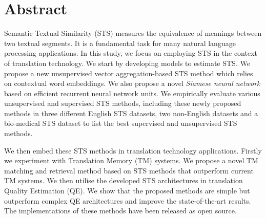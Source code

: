\newpage
{} \label{abstract}

\chapter*{Abstract}
Semantic Textual Similarity (STS) measures the equivalence of meanings between two textual segments. It is a fundamental task for many natural language processing applications. In this study, we focus on employing STS in the context of translation technology. We start by developing models to estimate STS. We propose a new unsupervised vector aggregation-based STS method which relies on contextual word embeddings. We also propose a novel \textit{Siamese neural network} based on efficient recurrent neural network units. We empirically evaluate various unsupervised and supervised STS methods, including these newly proposed methods in three different English STS datasets, two non-English datasets and a bio-medical STS dataset to list the best supervised and unsupervised STS methods.

We then embed these STS methods in translation technology applications. Firstly we experiment with Translation Memory (TM) systems. We propose a novel TM matching and retrieval method based on STS methods that outperform current TM systems. We then utilise the developed STS architectures in translation Quality Estimation (QE). We show that the proposed methods are simple but outperform complex QE architectures and improve the state-of-the-art results. The implementations of these methods have been released as open source.



